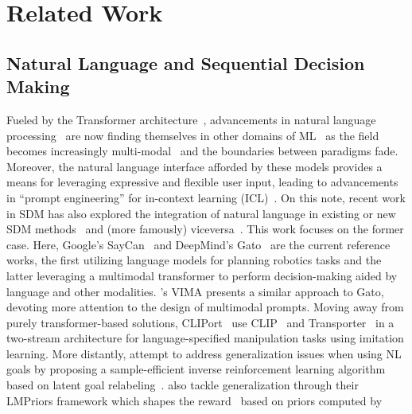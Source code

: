 \documentclass[../main.tex]{subfiles}
\begin{document}
\chapter{Related Work}\label{rel:chap}

\section{Natural Language and Sequential Decision Making}

Fueled by the Transformer architecture~\citep{vaswani_attention_2017}, advancements in natural
language processing~\citep{vaswani_attention_2017, devlin_bert_2019, brown_language_2020} are now
finding themselves in other domains of ML~\citep{radford_learning_2021,
	rombach_high-resolution_2022, dhariwal_jukebox_2020} as the field becomes increasingly multi-modal~\citep{baltrusaitis_multimodal_2019, xu_multimodal_2022} and the boundaries between paradigms fade.
Moreover, the natural language interface afforded by these models provides a means for leveraging
expressive and flexible user input, leading to advancements in ``prompt engineering'' for in-context
learning (ICL)~\citep{dohan_language_2022, dosovitskiy_image_2022, reynolds_prompt_2021,
	wei_chain--thought_2022, hertz_prompt--prompt_2022}. On this note, recent work in SDM has also
explored the integration of natural language in existing or new SDM methods~\citep{luketina_survey_2019} and (more famously) viceversa~\citep{ouyang_training_2022}. This work
focuses on the former case. Here, Google's SayCan~\citep{ahn_as_2022} and DeepMind's Gato~\citep{reed_generalist_2022} are the current reference works, the first utilizing language models
for planning robotics tasks and the latter leveraging a multimodal transformer to perform
decision-making aided by language and other modalities. 's VIMA presents
a similar approach to Gato, devoting more attention to the design of multimodal prompts. Moving away
from purely transformer-based solutions, CLIPort~\citep{shridhar_cliport_2021} use CLIP~\citep{radford_learning_2021} and Transporter~\citep{zeng_transporter_2021} in a two-stream
architecture for language-specified manipulation tasks using imitation learning. More distantly,
\citet{zhou_inverse_2021} attempt to address generalization issues when using NL goals by proposing
a sample-efficient inverse reinforcement learning algorithm based on latent goal relabeling~\citep{nair_visual_2018}.  also tackle generalization through their
LMPriors framework which shapes the reward~\citep{ng_policy_1999} based on priors computed by
\end{document}
